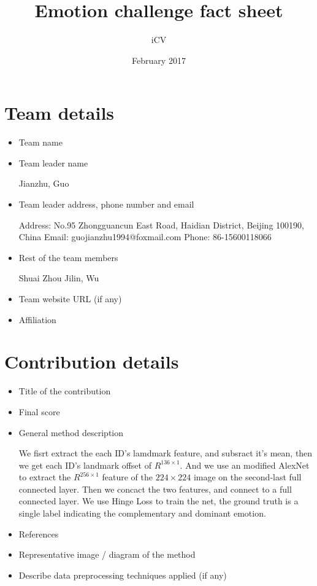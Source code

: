 \documentclass{article}
\title{Emotion challenge fact sheet}
\author{iCV}
\date{February 2017}
\begin{document}
\maketitle

\section{Team details}

\begin{itemize}
\item Team name 
                              
\item Team leader name                           

Jianzhu, Guo
\item Team leader address, phone number and email 

Address: No.95 Zhongguancun East Road, Haidian District, Beijing 100190, China
Email: guojianzhu1994@foxmail.com
Phone: 86-15600118066
\item Rest of the team members      

Shuai Zhou
Jilin, Wu
\item Team website URL (if any)                   
\item Affiliation
\end{itemize}

\section{Contribution details}

\begin{itemize}
\item Title of the contribution                                  
\item Final score                                               
\item General method description     

We fisrt extract the each ID's lamdmark feature, and subsract it's mean, then we get each ID's landmark offset of $R^{136\times1}$. And we use an modified AlexNet to extract the $R^{256\times1}$ feature of the $224\times224$ image on the second-last full connected layer. Then we concact the two features, and connect to a full connected layer. We use Hinge Loss to train the net, the ground truth is a single label indicating the complementary and dominant emotion.
\item References                                               
\item Representative image / diagram of the method             
\item Describe data preprocessing techniques applied (if any)   
\end{itemize}
\end{document}
